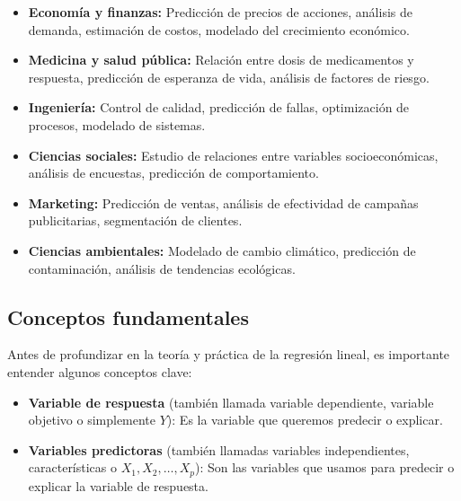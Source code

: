 \begin{itemize}
	\item \textbf{Economía y finanzas:} Predicción de precios de acciones, análisis de demanda, estimación de costos, modelado del crecimiento económico.
	
	\item \textbf{Medicina y salud pública:} Relación entre dosis de medicamentos y respuesta, predicción de esperanza de vida, análisis de factores de riesgo.
	
	\item \textbf{Ingeniería:} Control de calidad, predicción de fallas, optimización de procesos, modelado de sistemas.
	
	\item \textbf{Ciencias sociales:} Estudio de relaciones entre variables socioeconómicas, análisis de encuestas, predicción de comportamiento.
	
	\item \textbf{Marketing:} Predicción de ventas, análisis de efectividad de campañas publicitarias, segmentación de clientes.
	
	\item \textbf{Ciencias ambientales:} Modelado de cambio climático, predicción de contaminación, análisis de tendencias ecológicas.
\end{itemize}

\subsection{Conceptos fundamentales}

Antes de profundizar en la teoría y práctica de la regresión lineal, es importante entender algunos conceptos clave:

\begin{definicion}
	\begin{itemize}
		\item \textbf{Variable de respuesta} (también llamada variable dependiente, variable objetivo o simplemente $Y$): Es la variable que queremos predecir o explicar.
		\item \textbf{Variables predictoras} (también llamadas variables independientes, características o $X_1, X_2, \ldots, X_p$): Son las variables que usamos para predecir o explicar la variable de respuesta.
	\end{itemize}
\end{definicion}


